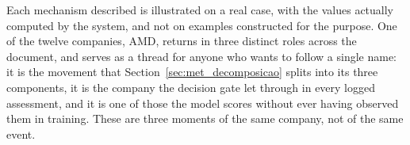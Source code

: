 Each mechanism described is illustrated on a real case, with the values actually computed by the
system, and not on examples constructed for the purpose. One of the twelve companies, AMD,
returns in three distinct roles across the document, and serves as a thread for anyone who
wants to follow a single name: it is the movement that Section~\ref{sec:met_decomposicao} splits
into its three components, it is the company the decision gate let through in every logged
assessment, and it is one of those the model scores without ever having observed them in
training. These are three moments of the same company, not of the same event.

%
